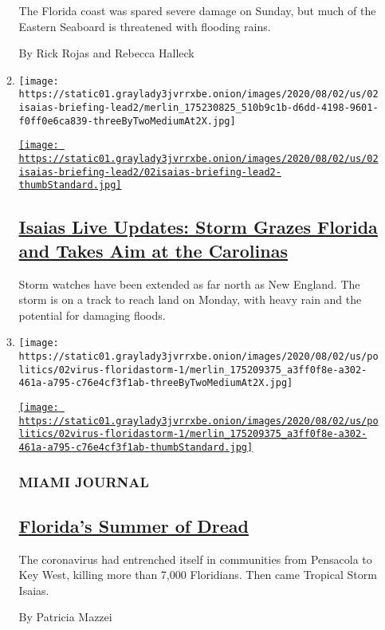 \begin{enumerate}
\begin{enumerate}
    The Florida coast was spared severe damage on Sunday, but much of
    the Eastern Seaboard is threatened with flooding rains.

    By Rick Rojas and Rebecca Halleck
  \item
    \texttt{[image: https://static01.graylady3jvrrxbe.onion/images/2020/08/02/us/02isaias-briefing-lead2/merlin\_175230825\_510b9c1b-d6dd-4198-9601-f0ff0e6ca839-threeByTwoMediumAt2X.jpg]}

    \href{/2020/08/02/us/Hurricane-Isaias-track.html}{\texttt{[image: https://static01.graylady3jvrrxbe.onion/images/2020/08/02/us/02isaias-briefing-lead2/02isaias-briefing-lead2-thumbStandard.jpg]}}

    \hypertarget{isaias-live-updates-storm-grazes-florida-and-takes-aim-at-the-carolinas}{%
    \subsection{\texorpdfstring{\href{/2020/08/02/us/Hurricane-Isaias-track.html}{Isaias
    Live Updates: Storm Grazes Florida and Takes Aim at the
    Carolinas}}{Isaias Live Updates: Storm Grazes Florida and Takes Aim at the Carolinas}}\label{isaias-live-updates-storm-grazes-florida-and-takes-aim-at-the-carolinas}}

    Storm watches have been extended as far north as New England. The
    storm is on a track to reach land on Monday, with heavy rain and the
    potential for damaging floods.
  \item
    \texttt{[image: https://static01.graylady3jvrrxbe.onion/images/2020/08/02/us/politics/02virus-floridastorm-1/merlin\_175209375\_a3ff0f8e-a302-461a-a795-c76e4cf3f1ab-threeByTwoMediumAt2X.jpg]}

    \href{/2020/08/02/us/florida-hurricane-isaias-coronavirus.html}{\texttt{[image: https://static01.graylady3jvrrxbe.onion/images/2020/08/02/us/politics/02virus-floridastorm-1/merlin\_175209375\_a3ff0f8e-a302-461a-a795-c76e4cf3f1ab-thumbStandard.jpg]}}

    \hypertarget{miami-journal}{%
    \subsubsection{MIAMI JOURNAL}\label{miami-journal}}

    \hypertarget{floridas-summer-of-dread}{%
    \subsection{\texorpdfstring{\href{/2020/08/02/us/florida-hurricane-isaias-coronavirus.html}{Florida's
    Summer of
    Dread}}{Florida's Summer of Dread}}\label{floridas-summer-of-dread}}

    The coronavirus had entrenched itself in communities from Pensacola
    to Key West, killing more than 7,000 Floridians. Then came Tropical
    Storm Isaias.

    By Patricia Mazzei
  \end{enumerate}
\end{enumerate}

